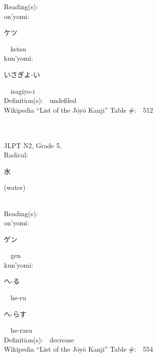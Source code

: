 \begin{multicols}{2}
Reading(s):\ \ \\
{\hspace*{1em}}on'yomi:\ \ \\
{\hspace*{2em}}{\begin{CJK}{UTF8}{min} ケツ \end{CJK}}\ \ ketsu\ \ \\
{\hspace*{1em}}kun'yomi:\ \ \\
{\hspace*{2em}}{\begin{CJK}{UTF8}{min} いさぎよ-い \end{CJK}}\ \ isagiyo-i\ \ \\
Definition(s):\ \ undefiled \\
Wikipedia ``List of the J\=oy\=o Kanji'' Table \#:\ \ 512 \\
\ \ \\
{\fontsize{34pt}{40pt}  }\ \ \\  %
{JLPT N2, Grade 5, \\Radical:\ \ {\begin{CJK}{UTF8}{min} 水 \end{CJK}} (water) } \\
Reading(s):\ \ \\
{\hspace*{1em}}on'yomi:\ \ \\
{\hspace*{2em}}{\begin{CJK}{UTF8}{min} ゲン \end{CJK}}\ \ gen\ \ \\
{\hspace*{1em}}kun'yomi:\ \ \\
{\hspace*{2em}}{\begin{CJK}{UTF8}{min} へ-る \end{CJK}}\ \ he-ru\ \ \\
{\hspace*{2em}}{\begin{CJK}{UTF8}{min} へ-らす \end{CJK}}\ \ he-rasu\ \ \\
Definition(s):\ \ decrease \\
Wikipedia ``List of the J\=oy\=o Kanji'' Table \#:\ \ 554 \\

\end{multicols}
